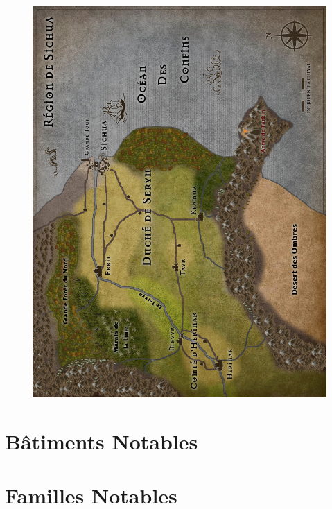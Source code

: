 \documentclass{dd}
\begin{document}
\begin{figure}[p]
\includegraphics[width=17.5cm]{Maps/RegionL.jpg}
\end{figure}



\chapter{Bâtiments Notables}







%

%


\chapter{Familles Notables}
\end{document}
